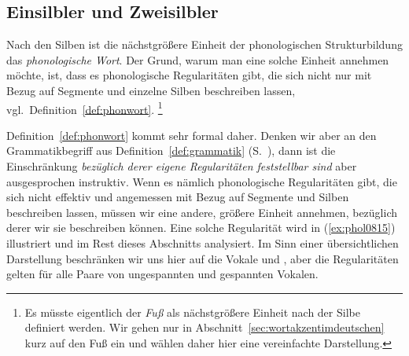 \subsection{Einsilbler und Zweisilbler}

\label{sec:einsilblerzweisilbler}


Nach den Silben ist die nächstgrößere Einheit der phonologischen Strukturbildung das \textit{phonologische Wort}.
Der Grund, warum man eine solche Einheit annehmen möchte, ist, dass es phonologische Regularitäten gibt, die sich nicht nur mit Bezug auf Segmente und einzelne Silben beschreiben lassen, vgl.\ Definition~\ref{def:phonwort}.%
\footnote{Es müsste eigentlich der \textit{Fuß} als nächstgrößere Einheit nach der Silbe definiert werden.
Wir gehen nur in Abschnitt~\ref{sec:wortakzentimdeutschen} kurz auf den Fuß ein und wählen daher hier eine vereinfachte Darstellung.}


Definition~\ref{def:phonwort} kommt sehr formal daher.
Denken wir aber an den Grammatikbegriff aus Definition~\ref{def:grammatik} (S.~\pageref{def:grammatik}), dann ist die Einschränkung \textit{bezüglich derer eigene Regularitäten feststellbar sind} aber ausgesprochen instruktiv.
Wenn es nämlich phonologische Regularitäten gibt, die sich nicht effektiv und angemessen mit Bezug auf Segmente und Silben beschreiben lassen, müssen wir eine andere, größere Einheit annehmen, bezüglich derer wir sie beschreiben können.
Eine solche Regularität wird in (\ref{ex:phol0815}) illustriert und im Rest dieses Abschnitts analysiert.
Im Sinn einer übersichtlichen Darstellung beschränken wir uns hier auf die Vokale \textipa{[I]} und \textipa{[i]}, aber die Regularitäten gelten für alle Paare von ungespannten und gespannten Vokalen.


\begin{exe}
  \ex\label{ex:phol0815}
  \begin{xlist}
  	\ex{\label{ex:phol0815b} *\textipa{[knI]}}
  	\ex{\label{ex:phol0815f} *\textipa{[vi:Nk]}}
  	\ex{\label{ex:phol0815k} *\textipa{[vi:Nk.t@]}}
  \end{xlist}
\end{exe}

